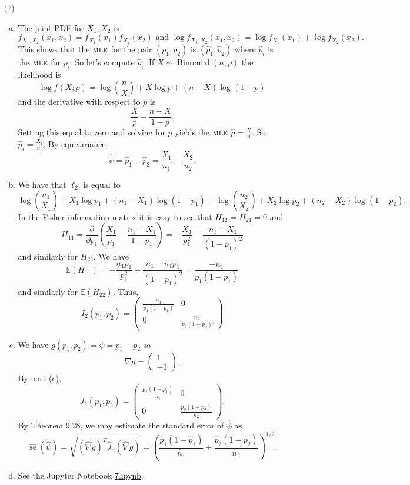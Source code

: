 \documentclass[10pt]{article}
\newcommand{\E}{\mathbb{E}}
\newcommand{\Binom}{\operatorname{Binomial}}
\newcommand{\se}{\operatorname{se}}
\newcommand{\MLE}{\textsc{mle}}
\begin{document}
\begin{enumerate}
\item[(7)]
\begin{enumerate}[(a)]
\item The joint PDF for $X_1,X_2$ is
\[
f_{X_1,X_2}(x_1,x_2)=f_{X_1}(x_1)f_{X_2}(x_2) \text{ and }
\log f_{X_1,X_2}(x_1,x_2) = \log f_{X_1}(x_1) + \log f_{X_2}(x_2).
\]
This shows that the $\MLE$ for the pair $(p_1,p_2)$ is $(\hat p_1,\hat p_2)$
where $\hat p_i$ is the $\MLE$ for $p_i$. So let's compute $\hat p_i$.
If $X\sim \Binom(n,p)$ the likelihood is
\[
\log f(X;p) = \log \binom{n}{X} + X\log p + (n-X)\log(1-p)
\]
and the derivative with respect to $p$ is
\[
\frac{X}{p} - \frac{n-X}{1-p}.
\]
Setting this equal to zero and solving for $p$ yields the $\MLE$
$\hat p = \frac{X}{n}$. So $\hat p_i = \frac{X_i}{n_i}$. By
equivariance
\[
\hat \psi = \hat p_1 - \hat p_2 = \frac{X_1}{n_1} - \frac{X_2}{n_2}.
\]

\item We have that $\ell_2$ is equal to
\[
\log \binom{n_1}{X_1} + X_1 \log p_1 + (n_1 - X_1)\log(1-p_1)
+ \log \binom{n_2}{X_2} + X_2 \log p_2 + (n_2 - X_2) \log(1-p_2).
\]
In the Fisher information matrix it is easy to see that $H_{12}=H_{21}=0$
and
\[
H_{11} =
\frac{\partial}{\partial p_1} \left(\frac{X_1}{p_1} - \frac{n_1-X_1}{1-p_1}\right)
= -\frac{X_1}{p_1^2} - \frac{n_1 - X_1}{(1-p_1)^2}
\]
and similarly for $H_{22}$. We have
\[
\E(H_{11}) = -\frac{n_1 p_1}{p_1^2} - \frac{n_1 - n_1 p_1}{(1-p_1)^2}
= \frac{-n_1}{p_1(1-p_1)}
\]
and similarly for $\E(H_{22})$. Thus,
\[
I_2(p_1,p_2) = \begin{pmatrix}
\frac{n_1}{p_1(1-p_1)} & 0 \\
0 & \frac{n_2}{p_2(1-p_2)}
\end{pmatrix}
\]

\item We have $g(p_1,p_2)=\psi = p_1 - p_2$ so
\[
\nabla g = \begin{pmatrix} 1 \\ -1 \end{pmatrix}.
\]
By part (c),
\[
J_2(p_1,p_2) = \begin{pmatrix}
\frac{p_1(1-p_1)}{n_1} & 0 \\
0 & \frac{p_2(1-p_2)}{n_2}
\end{pmatrix}.
\]
By Theorem 9.28, we may estimate the standard error of $\hat \psi$ as
\[
\hat{\se}(\hat \psi) = \sqrt{(\hat \nabla g)^T \hat J_n (\hat \nabla g)} =
\left(\frac{\hat p_1(1-\hat p_1)}{\hat n_1} + \frac{\hat p_2 (1-\hat p_2)}{\hat n_2}\right)^{1/2}.
\]

\item See the Jupyter Notebook
\href{https://github.com/ajrasmus/some_of_statistics/blob/main/chapter_9/7.ipynb}{7.ipynb}.


\end{enumerate}
\end{enumerate}
\end{document}
